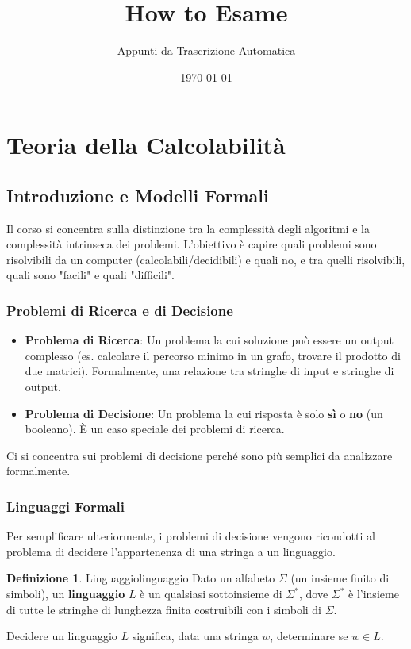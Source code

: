 \documentclass[a4paper]{article}
\title{How to Esame}
\author{Appunti da Trascrizione Automatica}
\date{\today}
\theoremstyle{definition} %
\newtheorem{definition}{Definizione}
\begin{document}
\maketitle
\tableofcontents
\newpage

\section{Teoria della Calcolabilità}

\subsection{Introduzione e Modelli Formali}
Il corso si concentra sulla distinzione tra la complessità degli algoritmi e la complessità intrinseca dei problemi. L'obiettivo è capire quali problemi sono risolvibili da un computer (calcolabili/decidibili) e quali no, e tra quelli risolvibili, quali sono "facili" e quali "difficili".

\subsubsection{Problemi di Ricerca e di Decisione}
\begin{itemize}
    \item \textbf{Problema di Ricerca}: Un problema la cui soluzione può essere un output complesso (es. calcolare il percorso minimo in un grafo, trovare il prodotto di due matrici). Formalmente, una relazione tra stringhe di input e stringhe di output.
    \item \textbf{Problema di Decisione}: Un problema la cui risposta è solo \textbf{sì} o \textbf{no} (un booleano). È un caso speciale dei problemi di ricerca.
\end{itemize}
Ci si concentra sui problemi di decisione perché sono più semplici da analizzare formalmente.

\subsubsection{Linguaggi Formali}
Per semplificare ulteriormente, i problemi di decisione vengono ricondotti al problema di decidere l'appartenenza di una stringa a un linguaggio.
\begin{definition}{Linguaggio}{linguaggio}
Dato un alfabeto $\Sigma$ (un insieme finito di simboli), un \textbf{linguaggio} $L$ è un qualsiasi sottoinsieme di $\Sigma^*$, dove $\Sigma^*$ è l'insieme di tutte le stringhe di lunghezza finita costruibili con i simboli di $\Sigma$.
\end{definition}
Decidere un linguaggio $L$ significa, data una stringa $w$, determinare se $w \in L$.
\end{document}
